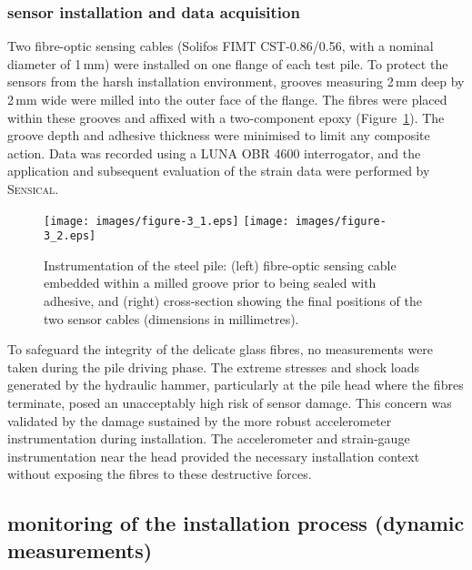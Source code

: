 {{{\subsubsection{sensor installation and data acquisition}

Two fibre-optic sensing cables (Solifos FIMT CST-0.86/0.56, with a nominal diameter of 1\,mm) were installed on one flange of each test pile. To protect the sensors from the harsh installation environment, grooves measuring 2\,mm deep by 2\,mm wide were milled into the outer face of the flange. The fibres were placed within these grooves and affixed with a two-component epoxy (Figure~\ref{fig:Bohle_mit_fiber_Applikation}). The groove depth and adhesive thickness were minimised to limit any composite action. Data was recorded using a LUNA OBR 4600 interrogator, and the application and subsequent evaluation of the strain data were performed by \textsc{Sensical}.

\begin{figure}[!htbp]
	\centering
	\texttt{[image: images/figure-3\_1.eps]}
	\hspace{1.5cm}
	\texttt{[image: images/figure-3\_2.eps]}
	\caption{Instrumentation of the steel pile: (left) fibre-optic sensing cable embedded within a milled groove prior to being sealed with adhesive, and (right) cross-section showing the final positions of the two sensor cables (dimensions in millimetres).}
	\label{fig:Bohle_mit_fiber_Applikation}
\end{figure}

To safeguard the integrity of the delicate glass fibres, no measurements were taken during the pile driving phase. The extreme stresses and shock loads generated by the hydraulic hammer, particularly at the pile head where the fibres terminate, posed an unacceptably high risk of sensor damage. This concern was validated by the damage sustained by the more robust accelerometer instrumentation during installation. The accelerometer and strain-gauge instrumentation near the head provided the necessary installation context without exposing the fibres to these destructive forces.

\subsection{monitoring of the installation process (dynamic measurements)}
\label{sec:dynamic_installation_intro}


\todo[inline]{Add photographs of the individual sensor installations once image rights are cleared. %



}}}}
